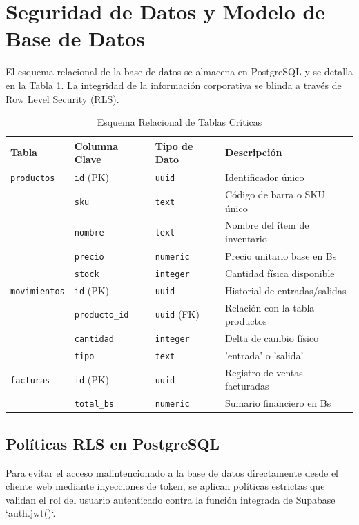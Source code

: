 \documentclass[11pt,a4paper]{article}
\begin{document}
\newpage

\section{Seguridad de Datos y Modelo de Base de Datos}
El esquema relacional de la base de datos se almacena en PostgreSQL y se detalla en la Tabla \ref{tab:schema}. La integridad de la información corporativa se blinda a través de Row Level Security (RLS).

\begin{table}[h]
\centering
\caption{Esquema Relacional de Tablas Críticas}
\label{tab:schema}
\begin{tabular}{@{}llll@{}}
\toprule
\textbf{Tabla} & \textbf{Columna Clave} & \textbf{Tipo de Dato} & \textbf{Descripción} \\ \midrule
\texttt{productos} & \texttt{id} (PK) & \texttt{uuid} & Identificador único \\
 & \texttt{sku} & \texttt{text} & Código de barra o SKU único \\
 & \texttt{nombre} & \texttt{text} & Nombre del ítem de inventario \\
 & \texttt{precio} & \texttt{numeric} & Precio unitario base en Bs \\
 & \texttt{stock} & \texttt{integer} & Cantidad física disponible \\
\texttt{movimientos} & \texttt{id} (PK) & \texttt{uuid} & Historial de entradas/salidas \\
 & \texttt{producto\_id} & \texttt{uuid} (FK) & Relación con la tabla productos \\
 & \texttt{cantidad} & \texttt{integer} & Delta de cambio físico \\
 & \texttt{tipo} & \texttt{text} & 'entrada' o 'salida' \\
\texttt{facturas} & \texttt{id} (PK) & \texttt{uuid} & Registro de ventas facturadas \\
 & \texttt{total\_bs} & \texttt{numeric} & Sumario financiero en Bs \\
\bottomrule
\end{tabular}
\end{table}

\subsection{Políticas RLS en PostgreSQL}
Para evitar el acceso malintencionado a la base de datos directamente desde el cliente web mediante inyecciones de token, se aplican políticas estrictas que validan el rol del usuario autenticado contra la función integrada de Supabase `auth.jwt()`.
\end{document}

